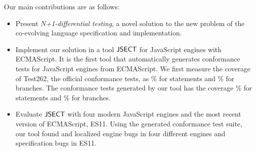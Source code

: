 Our main contributions are as follows:
\begin{itemize}
  \item Present \textit{$N$+1-differential testing}, a novel solution to the new
    problem of the co-evolving language specification and implementation.
  \item Implement our solution in a tool $\text{\sf JSECT}$ for JavaScript engines with
    ECMAScript.  It is the first tool that automatically generates conformance
    tests for JavaScript engines from ECMAScript.  We first measure the coverage
    of Test262, the official conformance tests, as \inred{-}\% for statements
    and \inred{-}\% for branches.  The conformance tests generated by our tool
    has the coverage \inred{-}\% for statements and \inred{-}\% for branches.
  \item Evaluate $\text{\sf JSECT}$ with four modern JavaScript engines and the most recent
    version of ECMAScript, ES11.  Using the generated conformance test
    suite, our tool found and localized  engine bugs in four different
    engines and  specification bugs in ES11.
\end{itemize}
